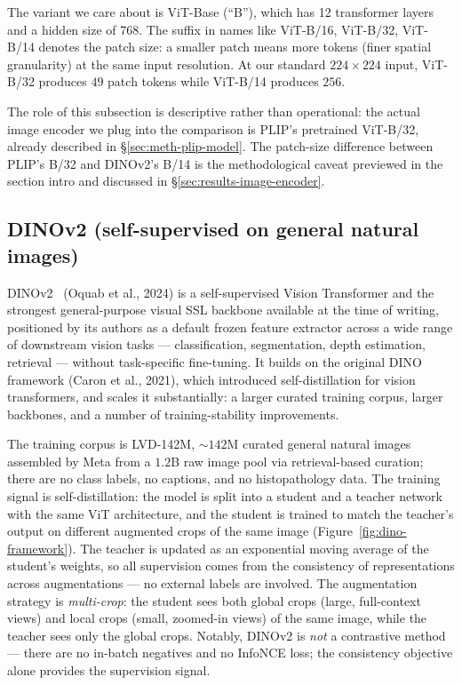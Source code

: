 The variant we care about is ViT-Base (``B''), which has 12 transformer layers and a hidden size of 768. The suffix in names like ViT-B/16, ViT-B/32, ViT-B/14 denotes the patch size: a smaller patch means more tokens (finer spatial granularity) at the same input resolution. At our standard $224 \times 224$ input, ViT-B/32 produces $49$ patch tokens while ViT-B/14 produces $256$.

The role of this subsection is descriptive rather than operational: the actual image encoder we plug into the comparison is PLIP's pretrained ViT-B/32, already described in §\ref{sec:meth-plip-model}. The patch-size difference between PLIP's B/32 and DINOv2's B/14 is the methodological caveat previewed in the section intro and discussed in §\ref{sec:results-image-encoder}.

\subsection{DINOv2 (self-supervised on general natural images)}
\label{sec:meth-image-dinov2}

DINOv2~\cite{oquab2024dinov2} (Oquab et al., 2024) is a self-supervised Vision Transformer and the strongest general-purpose visual SSL backbone available at the time of writing, positioned by its authors as a default frozen feature extractor across a wide range of downstream vision tasks --- classification, segmentation, depth estimation, retrieval --- without task-specific fine-tuning. It builds on the original DINO~\cite{caron2021dino} framework (Caron et al., 2021), which introduced self-distillation for vision transformers, and scales it substantially: a larger curated training corpus, larger backbones, and a number of training-stability improvements.

The training corpus is LVD-142M, $\sim 142$M curated general natural images assembled by Meta from a $1.2$B raw image pool via retrieval-based curation; there are no class labels, no captions, and no histopathology data. The training signal is self-distillation: the model is split into a student and a teacher network with the same ViT architecture, and the student is trained to match the teacher's output on different augmented crops of the same image (Figure~\ref{fig:dino-framework}). The teacher is updated as an exponential moving average of the student's weights, so all supervision comes from the consistency of representations across augmentations --- no external labels are involved. The augmentation strategy is \emph{multi-crop}: the student sees both global crops (large, full-context views) and local crops (small, zoomed-in views) of the same image, while the teacher sees only the global crops. Notably, DINOv2 is \emph{not} a contrastive method --- there are no in-batch negatives and no InfoNCE loss; the consistency objective alone provides the supervision signal.


